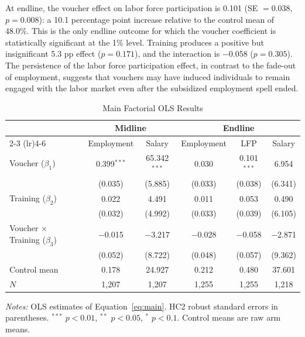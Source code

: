 \documentclass[12pt]{article}
\begin{document}
At endline, the voucher effect on labor force participation is 0.101 (SE $= 0.038$, $p = 0.008$): a 10.1 percentage point increase relative to the control mean of 48.0\%. This is the only endline outcome for which the voucher coefficient is statistically significant at the 1\% level. Training produces a positive but insignificant 5.3 pp effect ($p = 0.171$), and the interaction is $-0.058$ ($p = 0.305$). The persistence of the labor force participation effect, in contrast to the fade-out of employment, suggests that vouchers may have induced individuals to remain engaged with the labor market even after the subsidized employment spell ended.

\begin{table}[htbp]
\centering
\caption{Main Factorial OLS Results}
\label{tab:main}
\begin{threeparttable}
\begin{tabular}{@{}lccccc@{}}
\toprule
 & \multicolumn{2}{c}{Midline} & \multicolumn{3}{c}{Endline} \\
\cmidrule(lr){2-3} \cmidrule(lr){4-6}
 & Employment & Salary & Employment & LFP & Salary \\
\midrule
Voucher ($\beta_1$) & 0.399$^{***}$ & 65.342$^{***}$ & 0.030 & 0.101$^{***}$ & 6.954 \\
 & (0.035) & (5.885) & (0.033) & (0.038) & (6.341) \\[4pt]
Training ($\beta_2$) & 0.022 & 4.491 & 0.011 & 0.053 & 0.490 \\
 & (0.032) & (4.992) & (0.033) & (0.039) & (6.105) \\[4pt]
Voucher $\times$ Training ($\beta_3$) & $-$0.015 & $-$3.217 & $-$0.028 & $-$0.058 & $-$2.871 \\
 & (0.052) & (8.722) & (0.048) & (0.057) & (9.362) \\[4pt]
\midrule
Control mean & 0.178 & 24.927 & 0.212 & 0.480 & 37.601 \\
$N$ & 1,207 & 1,207 & 1,255 & 1,255 & 1,218 \\
\bottomrule
\end{tabular}
\begin{tablenotes}[flushleft]
\small
\item \textit{Notes:} OLS estimates of Equation~\eqref{eq:main}. HC2 robust standard errors in parentheses. $^{***}$ $p < 0.01$, $^{**}$ $p < 0.05$, $^{*}$ $p < 0.1$. Control means are raw arm means.
\end{tablenotes}
\end{threeparttable}
\end{table}
\end{document}

